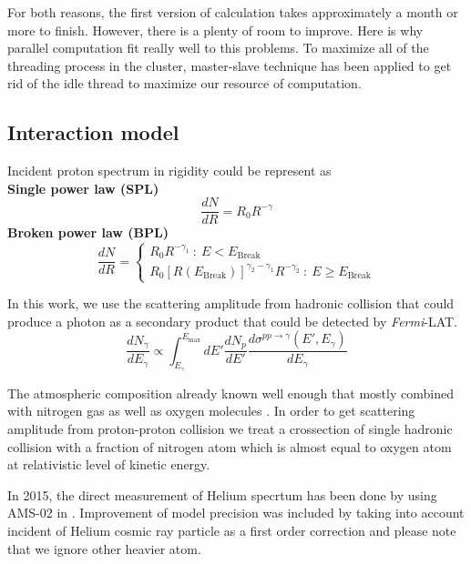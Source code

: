For both reasons, the first version of calculation takes approximately a month or more to finish.
However, there is a plenty of room to improve. Here is why parallel computation fit really well to this problems.
To maximize all of the threading process in the cluster, master-slave technique has been applied to get rid of the idle thread to maximize our resource of computation.


\subsection{Interaction model}
Incident proton spectrum in rigidity could be represent as \\
\textbf{Single power law (SPL)}
\begin{equation}
    \frac{dN}{dR} = R_0R^{-\gamma}
    \label{eq:spl}
\end{equation}
\textbf{Broken power law (BPL)}
\begin{equation}
\frac{dN}{dR}=
  \begin{cases}
    R_0R^{-\gamma_1}\ :\ E < E_{\text{Break}}\\
    R_0[R(E_{\text{Break}})]^{\gamma_2-\gamma_1}R^{-\gamma_2}\ :\ E \ge E_{\text{Break}}
  \end{cases}
  \label{eq:bpl}
\end{equation}

In this work, we use the scattering amplitude from hadronic collision \cite{K&Omodel} that could produce a photon as a secondary product that could be detected by \textit{Fermi}-LAT.
\begin{equation}
    \frac{dN_\gamma}{dE_\gamma} \propto \int^{E_{\text{max}}}_{E_\gamma} dE'\frac{dN_p}{dE'} \frac{d\sigma^{pp\rightarrow\gamma}(E',E_\gamma)}{dE_\gamma}
\end{equation}
\par The atmospheric composition already known well enough that mostly combined with nitrogen gas as well as oxygen molecules \cite{atmosCompos}. 
In order to get scattering amplitude from proton-proton collision we treat a crossection of single hadronic collision with a fraction of nitrogen atom which is almost equal to oxygen atom \cite{WAtwater} at relativistic level of kinetic energy.
\par In 2015, the direct measurement of Helium specrtum has been done by using AMS-02 in \cite{AMS-02Helium}. Improvement of model precision was included by taking into account incident of Helium cosmic ray particle as a first order correction and please note that we ignore other heavier atom.

